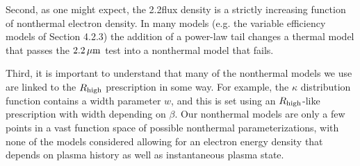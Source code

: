 Second, as one might expect, the 2.2\um flux density is a strictly increasing function of nonthermal electron density.  In many models (e.g. the variable efficiency models of Section 4.2.3) the addition of a power-law tail changes a thermal model that passes the $2.2\,\mu\mathrm{m}$ test into a nonthermal model that fails.

Third, it is important to understand that many of the nonthermal models we use are linked to the $R_\mathrm{high}$ prescription in some way.  For example, the $\kappa$ distribution function contains a width parameter $w$, and this is set using an $R_\mathrm{high}$-like prescription with width depending on $\beta$.  Our nonthermal models are only a few points in a vast function space of possible nonthermal parameterizations, with none of the models considered allowing for an electron energy density that depends on plasma history as well as instantaneous plasma state.






